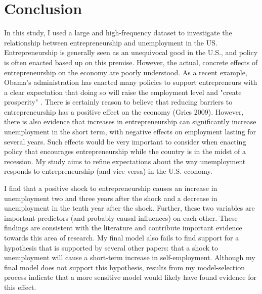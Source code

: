 \documentclass[]{ecca}
\begin{document}
\section{Conclusion}

In this study, I used a large and high-frequency dataset to investigate the relationship between entrepreneurship and unemployment in the US. Entrepreneurship is generally seen as an unequivocal good in the U.S., and policy is often enacted based up on this premise. However, the actual, concrete effects of entrepreneurship on the economy are poorly understood. As a recent example, Obama's administration has enacted many policies to support entrepreneurs with a clear expectation that doing so will raise the employment level and "create prosperity" \citep{obama}. There is certainly reason to believe that reducing barriers to entrepreneurship has a positive effect on the economy (Gries 2009). However, there is also evidence that increases in entrepreneurship can significantly increase unemployment in the short term, with negative effects on employment lasting for several years. Such effects would be very important to consider when enacting policy that encourages entrepreneurship while the country is in the midst of a recession. My study aims to refine expectations about the way unemployment responds to entrepreneurship (and vice versa) in the U.S. economy. 

I find that a positive shock to entrepreneurship causes an increase in unemployment two and three years after the shock and a decrease in unemployment in the tenth year after the shock. Further, these two variables are important predictors (and probably causal influences) on each other. These findings are consistent with the literature and contribute important evidence towards this area of research. My final model also fails to find support for a hypothesis that is supported by several other papers: that a shock to unemployment will cause a short-term increase in self-employment. Although my final model does not support this hypothesis, results from my model-selection process indicate that a more sensitive model would likely have found evidence for this effect.
\end{document}
